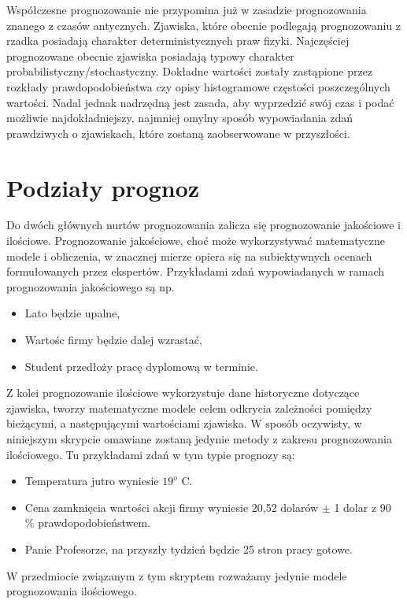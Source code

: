 \documentclass[10pt,a4paper]{book}
\begin{document}
Współczesne prognozowanie nie przypomina już w zasadzie prognozowania znanego z czasów antycznych. Zjawiska, które obecnie podlegają prognozowaniu z rzadka posiadają charakter deterministycznych praw fizyki. Najczęściej prognozowane obecnie zjawiska posiadają typowy charakter probabilistyczny/stochastyczny. Dokładne wartości zostały zastąpione przez rozkłady prawdopodobieństwa czy opisy histogramowe częstości poszczególnych wartości. Nadal jednak nadrzędną jest zasada, aby wyprzedzić swój czas i podać możliwie najdokładniejszy, najmniej omylny sposób wypowiadania zdań prawdziwych o zjawiskach, które zostaną zaobserwowane w przyszłości.

\section{Podziały prognoz}

Do dwóch głównych nurtów prognozowania zalicza się \citep[Ch. 1]{montgomery2015introduction} prognozowanie jakościowe i ilościowe. Prognozowanie jakościowe, choć może wykorzystywać matematyczne modele i obliczenia, w znacznej mierze opiera się na subiektywnych ocenach formułowanych przez ekspertów. Przykładami zdań wypowiadanych w ramach prognozowania jakościowego są np.
\begin{itemize}
\item Lato będzie upalne,
\item Wartośc firmy będzie dalej wzrastać,
\item Student przedłoży pracę dyplomową w terminie.
\end{itemize}
Z kolei prognozowanie ilościowe wykorzystuje dane historyczne dotyczące zjawiska, tworzy matematyczne modele celem odkrycia zależności pomiędzy bieżącymi, a następującymi wartościami zjawiska. W sposób oczywisty, w niniejszym skrypcie omawiane zostaną jedynie metody z zakresu prognozowania ilościowego. Tu przykładami zdań w tym typie prognozy są:
\begin{itemize}
\item Temperatura jutro wyniesie $19^o$ C.
\item Cena zamknięcia wartości akcji firmy wyniesie 20,52 dolarów $\pm$ 1
dolar z 90 $\%$ prawdopodobieństwem.
\item Panie Profesorze, na przyszły tydzień będzie 25 stron pracy gotowe.
\end{itemize}
W przedmiocie związanym z tym skryptem rozważamy jedynie modele prognozowania ilościowego.
\end{document}
